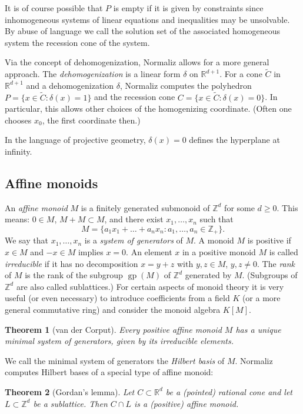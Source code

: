 \documentclass[12pt,a4paper]{scrartcl}
\newtheorem{theorem}{Theorem}
\theoremstyle{definition}
\def\ZZ{{\mathbb Z}}
\def\RR{{\mathbb R}}
\DeclareMathOperator{\gp}{gp}
\begin{document}
It is of course possible that $P$ is empty if it is given by constraints since inhomogeneous systems of linear equations and inequalities may be unsolvable. By abuse of language we call the solution set of the associated homogeneous system the recession cone of the system.

Via the concept of dehomogenization, Normaliz allows for a more general approach. The \emph{dehomogenization} is a linear form $\delta$ on $\RR^{d+1}$. For a cone $\widetilde C$ in $\RR^{d+1}$ and a dehomogenization $\delta$, Normaliz computes the polyhedron $P=\{x\in \widetilde C: \delta(x)=1\}$ and the recession cone $C=\{x\in \widetilde C: \delta(x)=0\}$. In particular, this allows other choices of the homogenizing coordinate. (Often one chooses $x_0$, the first coordinate then.)

In the language of projective geometry, $\delta(x)=0$ defines the hyperplane at infinity.

\subsection{Affine monoids}

An \emph{affine monoid} $M$ is a finitely generated submonoid of $\ZZ^d$ for some $d\ge0$. This means: $0\in M$, $M+M\subset M$, and there exist $x_1,\dots,x_n$ such that
$$
M=\{a_1x_1+\dots+a_nx_n: a_1,\dots,a_n\in\ZZ_+\}.
$$
We say that $x_1,\dots,x_n$ is a \emph{system of generators} of $M$. A monoid $M$ is positive if $x\in M$ and $-x\in M$ implies $x=0$.  An element $x$ in a positive monoid $M$ is called \emph{irreducible} if it has no decomposition $x=y+z$ with $y,z\in M$, $y,z\neq0$. The \emph{rank} of $M$ is the rank of the subgroup $\gp(M)$ of $\ZZ^d$ generated by $M$. (Subgroups of $\ZZ^d$ are also called sublattices.)
For certain aspects of monoid theory it is very useful (or even necessary) to introduce coefficients from a field $K$ (or a more general commutative ring) and consider the monoid algebra $K[M]$.


\begin{theorem}[van der Corput]
	Every positive affine monoid $M$ has a unique minimal system of generators, given by its irreducible elements.
\end{theorem}

We call the minimal system of generators the \emph{Hilbert basis} of $M$. Normaliz computes Hilbert bases of a special type of affine monoid:

\begin{theorem}[Gordan's lemma]
	Let $C\subset\RR^d$ be a (pointed) rational cone and let $L\subset \ZZ^d$ be a sublattice. Then $C\cap L$ is a (positive) affine monoid.
\end{theorem}
\end{document}

